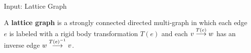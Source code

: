 \begin{frame}{Input: Lattice Graph}
  
    \begin{definition}
      A \textbf{lattice graph} is a strongly connected directed
      multi-graph in which each edge $e$ is labeled with a rigid body
      transformation $T(e)$ and each ${v}\overset{T(e)}{\longrightarrow}{w}$ has an
      inverse edge ${w}\overset{T(e)^{-1}}{\longrightarrow}{v}$.  
    \end{definition}
  
\end{frame}